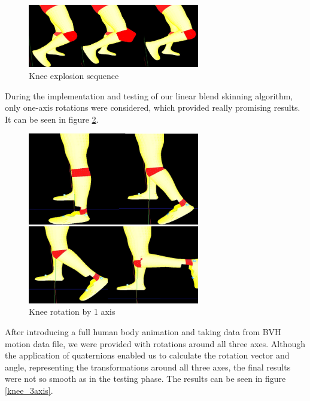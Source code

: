 \documentclass[times, 10pt,twocolumn]{article}
\begin{document}
\begin{figure}[H]
  \caption{Knee explosion sequence}
  \label{knee_explosion}
  \centering
  \includegraphics[width=75mm]{images/s_knee_explosion.jpg}
\end{figure}


During the implementation and testing of our linear blend skinning algorithm, only one-axis rotations were considered, which provided really promising results. It can be seen in figure \ref{knee_1axis}.

\begin{figure}[H]
  \caption{Knee rotation by 1 axis}
  \label{knee_1axis}
  \centering
  \includegraphics[width=75mm]{images/s_knee_rot1.jpg}
\end{figure}

After introducing a full human body animation and taking data from BVH motion data file, we were provided with rotations around all three axes. Although the application of quaternions enabled us to calculate the rotation vector and angle, representing the transformations around all three axes, the final results were not so smooth as in the testing phase. The results can be seen in figure \ref{knee_3axis}.
\end{document}

